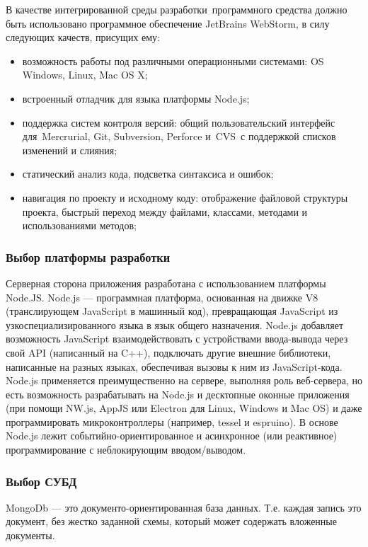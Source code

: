 В качестве интегрированной среды разработки программного средства должно быть использовано программное обеспечение JetBrains WebStorm, в силу следующих качеств, присущих ему:
\begin{itemize}
  \item возможность работы под различными операционными системами: OS Windows, Linux, Mac OS X;
  \item встроенный отладчик для языка платформы Node.js;
  \item поддержка систем контроля версий: общий пользовательский интерфейс для Mercrurial, Git, Subversion, Perforce и CVS с поддержкой списков изменений и слияния;

  \item статический анализ кода, подсветка синтаксиса и ошибок;
  \item навигация по проекту и исходному коду: отображение файловой структуры проекта, быстрый переход между файлами, классами, методами и использованиями методов;
\end{itemize}

\subsubsection{Выбор платформы разработки }

 Серверная сторона приложения разработана с использованием платформы Node.JS.
Node.js — программная платформа, основанная на движке V8 (транслирующем JavaScript в машинный код), превращающая JavaScript из узкоспециализированного языка в язык общего назначения. Node.js добавляет возможность JavaScript взаимодействовать с устройствами ввода-вывода через свой API (написанный на C++), подключать другие внешние библиотеки, написанные на разных языках, обеспечивая вызовы к ним из JavaScript-кода. Node.js применяется преимущественно на сервере, выполняя роль веб-сервера, но есть возможность разрабатывать на Node.js и десктопные оконные приложения (при помощи NW.js, AppJS или Electron для Linux, Windows и Mac OS) и даже программировать микроконтроллеры (например, tessel и espruino). В основе Node.js лежит событийно-ориентированное и асинхронное (или реактивное) программирование с неблокирующим вводом/выводом.

\subsubsection{Выбор СУБД }

 MongoDb — это документо-ориентированная база данных. Т.е. каждая запись это документ, без жестко заданной схемы, который может содержать вложенные документы.

